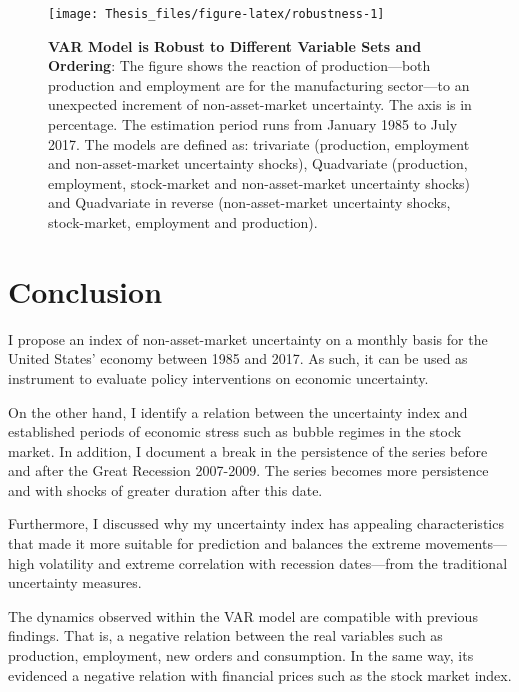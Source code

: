 \documentclass[12pt,twoside]{reedthesis}
\begin{document}
\begin{figure}

{\centering \texttt{[image: Thesis\_files/figure-latex/robustness-1]} 

}

\caption[VAR Model is Robust to Different Variable Sets and Ordering]{\textbf{VAR Model is Robust to Different Variable Sets and Ordering}: The figure shows the reaction of production---both production and employment are for the manufacturing sector---to an unexpected increment of non-asset-market uncertainty. The axis is in percentage. The estimation period runs from January 1985 to July 2017. The models are defined as: trivariate (production, employment and non-asset-market uncertainty shocks), Quadvariate (production, employment, stock-market and non-asset-market uncertainty shocks) and Quadvariate in reverse (non-asset-market uncertainty shocks, stock-market, employment and production).}\label{fig:robustness}
\end{figure}
\hypertarget{conclusion}{%
\chapter*{Conclusion}\label{conclusion}}

I propose an index of non-asset-market uncertainty on a monthly basis for the United States' economy between 1985 and 2017. As such, it can be used as instrument to evaluate policy interventions on economic uncertainty.

On the other hand, I identify a relation between the uncertainty index and established periods of economic stress such as bubble regimes in the stock market. In addition, I document a break in the persistence of the series before and after the Great Recession 2007-2009. The series becomes more persistence and with shocks of greater duration after this date.

Furthermore, I discussed why my uncertainty index has appealing characteristics that made it more suitable for prediction and balances the extreme movements---high volatility and extreme correlation with recession dates---from the traditional uncertainty measures.

The dynamics observed within the VAR model are compatible with previous findings. That is, a negative relation between the real variables such as production, employment, new orders and consumption. In the same way, its evidenced a negative relation with financial prices such as the stock market index.
\end{document}
